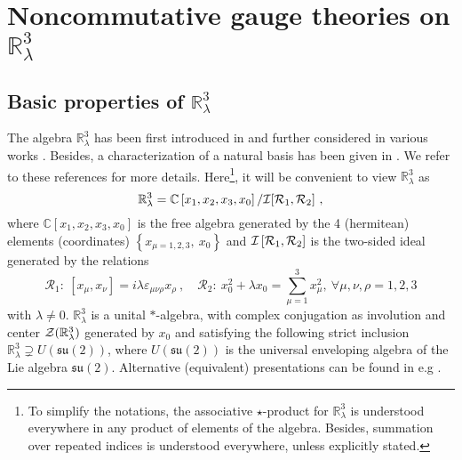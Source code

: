 \documentclass[a4paper,11pt,twoside]{article}
\numberwithin{equation}{section}
\theoremstyle{nonumberplain}
\newcounter{and}
\begin{document}
\section{\texorpdfstring{Noncommutative gauge theories on $\mathbb{R}^3_\lambda$}{Noncommutative gauge theories}} \label{section2}

\subsection{\texorpdfstring{Basic properties of $\mathbb{R}^3_\lambda$}{R3l}}\label{subsection21}

The algebra $\mathbb{R}^3_\lambda$ has been first introduced in \cite{Hammaa} and further considered in various works \cite{selene,vit-wal-12,gervitwal-13}. Besides, a characterization of a natural basis has been given in \cite{vit-wal-12}. We refer to these references for more details. Here{\footnote{To simplify the notations, the associative $\star$-product for $\mathbb{R}^3_\lambda$ is understood everywhere in any product of elements of the algebra. Besides, summation over repeated indices is understood everywhere, unless explicitly stated.}}, it will be convenient to view $\mathbb{R}^3_\lambda$ as \cite{vit-wal-12,gervitwal-13}%
%
\begin{equation}
\mathbb{R}^3_\lambda=\mathbb{C}\left[x_1,x_2,x_3,x_0\right]/{\mathcal{I}}[{\mathcal{R}}_1,{\cal{R}}_2] \ , \label{defining} 
\end{equation}
%
where $\mathbb{C}\left[x_1,x_2,x_3,x_0\right]$ is the free algebra generated by the 4 (hermitean) elements (coordinates) $\left\{x_{\mu=1,2,3},\ x_0\right\}$ and ${\mathcal{I}}\left[{\mathcal{R}}_1,{\cal{R}}_2\right]$ is the two-sided ideal generated by the relations%
%
\begin{equation}
{\mathcal{R}}_1: \ [x_\mu,x_\nu] = i \lambda \varepsilon_{\mu\nu\rho} x_\rho \ , \quad
{\mathcal{R}}_2: \ x_0^2 + \lambda x_0 = \sum_{\mu=1}^3 x_\mu^2,\ \forall \mu,\nu,\rho=1,2,3\label{relat1}
\end{equation}
%
with $\lambda\ne0$. $\mathbb{R}^3_\lambda$ is a unital $*$-algebra, with complex conjugation as involution and center ${\cal{Z}}(\mathbb{R}^3_\lambda)$ generated by $x_0$ and satisfying the following strict inclusion $\mathbb{R}^3_\lambda\supsetneq U(\mathfrak{su}(2))$, where $U(\mathfrak{su}(2))$ is the universal enveloping algebra of the Lie algebra ${\mathfrak{su}}(2)$. Alternative (equivalent) presentations can be found in e.g \cite{selene, vit-wal-12, gervitwal-13}.\par%
\end{document}
